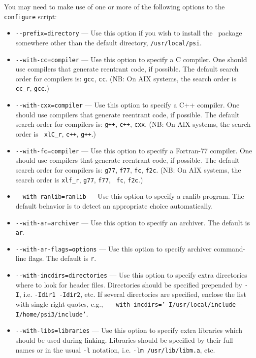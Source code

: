 \documentclass[12pt]{article}
\begin{document}
\noindent
You may need to make use of one or more of the following options to
the {\tt configure} script:
\begin{itemize}
\item {\tt -}{\tt -prefix=directory} --- Use this option if you wish to
  install the \PSIthree\ package somewhere other than the default
  directory, {\tt /usr/local/psi}.
\item {\tt -}{\tt -with-cc=compiler} --- Use this option to specify a C
  compiler.  One should use compilers that generate reentrant code,
  if possible. The default search order for compilers is: {\tt gcc},
  {\tt cc}.  (NB: On AIX systems, the search order is {\tt
  cc\_r}, {\tt gcc}.)
\item {\tt -}{\tt -with-cxx=compiler} --- Use this option to specify a C++
  compiler.  One should use compilers that generate reentrant code,
  if possible. The default search order for compilers is: {\tt g++},
  {\tt c++}, {\tt cxx}.  (NB: On AIX systems, the search order is {\tt
  xlC\_r}, {\tt c++}, {\tt g++}.)
\item {\tt -}{\tt -with-fc=compiler} --- Use this option to specify a
  Fortran-77 compiler.  One should use compilers that generate reentrant code,
  if possible. The default search order for compilers is:
  {\tt g77}, {\tt f77}, {\tt fc}, {\tt f2c}.  (NB: On AIX systems, the
  search order is {\tt xlf\_r}, {\tt g77}, {\tt f77}, {\tt
  fc}, {\tt f2c}.)
\item {\tt -}{\tt -with-ranlib=ranlib} --- Use this option to specify
a ranlib program. The default behavior is to detect an appropriate
choice automatically.
\item {\tt -}{\tt -with-ar=archiver} --- Use this option to specify an
  archiver.  The default is {\tt ar}.
\item {\tt -}{\tt -with-ar-flags=options} --- Use this option to specify
  archiver command-line flags. The default is {\tt r}.
\item {\tt -}{\tt -with-incdirs=directories} --- Use this option to specify extra
  directories where to look for header files. Directories should be specified
  prepended by {\tt -I}, i.e. {\tt -Idir1 -Idir2}, etc. If several directories are specified,
  enclose the list with single right-quotes, e.g., {\tt
  -}{\tt -with-incdirs='-I/usr/local/include -I/home/psi3/include'}.
\item {\tt -}{\tt -with-libs=libraries} --- Use this option to specify extra
  libraries which should be used during linking. Libraries should be specified by
  their full names or in the usual {\tt -l} notation, i.e. {\tt -lm /usr/lib/libm.a}, etc.

\end{itemize}
\end{document}
